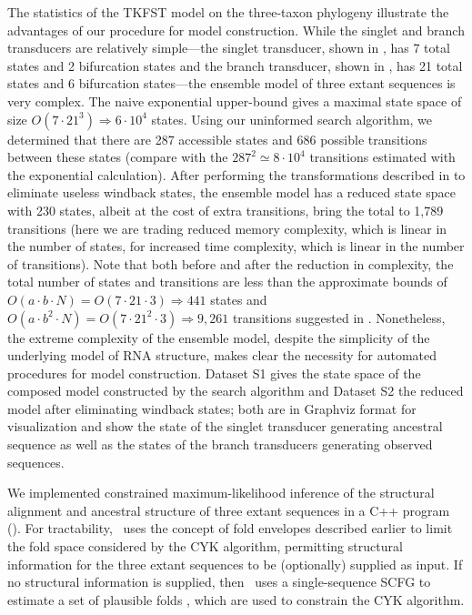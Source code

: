 \documentclass[10pt]{article}
\begin{document}
The statistics of the TKFST model on the three-taxon phylogeny
illustrate the advantages of our procedure for model construction.
While the singlet and branch transducers are relatively simple---the
singlet transducer, shown in , has 7 total states
and 2 bifurcation states and the branch transducer, shown in
, has 21 total states and 6 bifurcation
states---the ensemble model of three extant sequences is very complex.
The naive exponential upper-bound gives a maximal state space of size
$O(7 \cdot 21^{3}) \Rightarrow 6 \cdot 10^4$ states.  Using our
uninformed search algorithm, we determined that there are 287
accessible states and 686 possible transitions between these states
(compare with the $287^2 \simeq 8 \cdot 10^4$ transitions estimated
with the exponential calculation).  After performing the
transformations described in  to
eliminate useless windback states, the ensemble model has a reduced
state space with 230 states, albeit at the cost of extra transitions,
bring the total to 1,789 transitions (here we are trading reduced
memory complexity, which is linear in the number of states, for
increased time complexity, which is linear in the number of
transitions).  Note that both before and after the reduction in
complexity, the total number of states and transitions are less than
the approximate bounds of $O(a \cdot b \cdot N) = O(7 \cdot 21 \cdot
3) \Rightarrow 441$ states and $O(a \cdot b^2 \cdot N) = O(7 \cdot
21^2 \cdot 3) \Rightarrow 9,261$ transitions suggested in .
 Nonetheless, the extreme complexity of the
ensemble model, despite the simplicity of the underlying model of RNA
structure, makes clear the necessity for automated procedures for
model construction.  Dataset S1 gives the state space of the composed
model constructed by the search algorithm and Dataset S2 the reduced
model after eliminating windback states; both are in Graphviz format for
visualization and show the state of the singlet transducer generating
ancestral sequence as well as the states of the branch transducers
generating observed sequences.

We implemented constrained maximum-likelihood inference of the structural alignment 
and ancestral structure of three extant sequences in a C++ program (\indiegram).
For tractability, \indiegram\ uses the concept of fold envelopes
described earlier to limit the fold space considered by the CYK algorithm,
permitting structural information for the three extant sequences to be
(optionally) supplied as input.
If no structural information is supplied, then \indiegram\
uses a single-sequence SCFG to estimate a set of plausible folds \cite{Holmes2005},
which are used to constrain the CYK algorithm.
\end{document}
